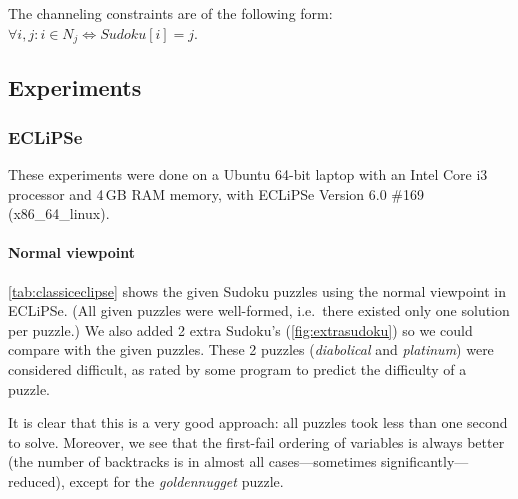 The channeling constraints are of the following form: $\forall i,j: i\in N_j \Leftrightarrow Sudoku[i] = j$.


\subsection{Experiments}
\setlength\sudokusize{ 6.5cm }

\subsubsection{ECLiPSe}
These experiments were done on a Ubuntu 64-bit laptop with an Intel Core i3 processor and 4\,GB RAM memory, with ECLiPSe Version 6.0 \#169 (x86\_64\_linux).
\paragraph{Normal viewpoint}
\autoref{tab:classiceclipse} shows the given Sudoku puzzles using the normal viewpoint in ECLiPSe. (All given puzzles were well-formed, i.e.~there existed only one solution per puzzle.) We also added 2 extra Sudoku's (\autoref{fig:extrasudoku}) so we could compare with the given puzzles. These 2 puzzles (\emph{diabolical} and \emph{platinum}) were considered difficult, as rated by some program to predict the difficulty of a puzzle.

It is clear that this is a very good approach: all puzzles took less than one second to solve. Moreover, we see that the first-fail ordering of variables is always better (the number of backtracks is in almost all cases---sometimes significantly---reduced), except for the \emph{goldennugget} puzzle. 

